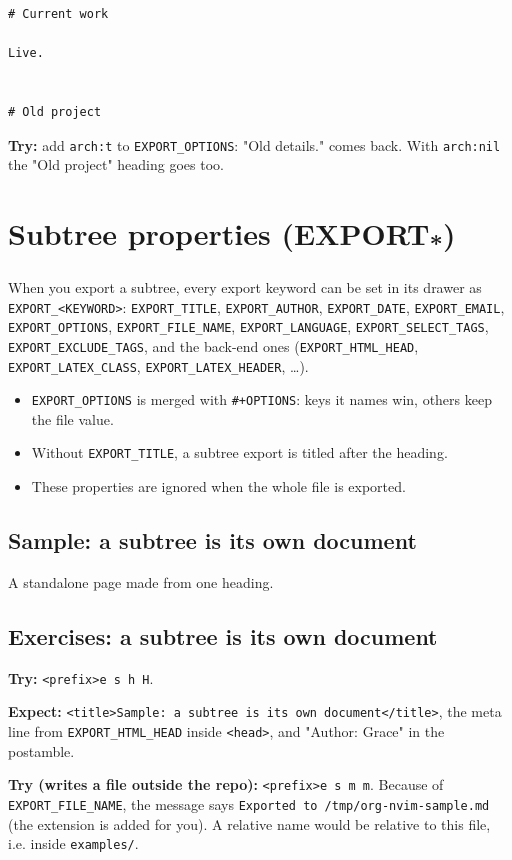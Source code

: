 \begin{verbatim}
# Current work

Live.


# Old project
\end{verbatim}

\textbf{Try:} add \texttt{arch:t} to \texttt{EXPORT\_OPTIONS}: "Old details." comes back. With
\texttt{arch:nil} the "Old project" heading goes too.
\section{Subtree properties (EXPORT\textsubscript{*})}
\label{sec:org05b67b0}
When you export a subtree, every export keyword can be set in its drawer as
\texttt{EXPORT\_<KEYWORD>}: \texttt{EXPORT\_TITLE}, \texttt{EXPORT\_AUTHOR}, \texttt{EXPORT\_DATE},
\texttt{EXPORT\_EMAIL}, \texttt{EXPORT\_OPTIONS}, \texttt{EXPORT\_FILE\_NAME}, \texttt{EXPORT\_LANGUAGE},
\texttt{EXPORT\_SELECT\_TAGS}, \texttt{EXPORT\_EXCLUDE\_TAGS}, and the back-end ones
(\texttt{EXPORT\_HTML\_HEAD}, \texttt{EXPORT\_LATEX\_CLASS}, \texttt{EXPORT\_LATEX\_HEADER}, \ldots{}).
\begin{itemize}
\item \texttt{EXPORT\_OPTIONS} is merged with \texttt{\#+OPTIONS}: keys it names win, others
keep the file value.
\item Without \texttt{EXPORT\_TITLE}, a subtree export is titled after the heading.
\item These properties are ignored when the whole file is exported.
\end{itemize}
\subsection{Sample: a subtree is its own document}
\label{sec:org0288272}
A standalone page made from one heading.
\subsection{Exercises: a subtree is its own document}
\label{sec:orgc8654cb}
\textbf{Try:} \texttt{<prefix>e s h H}.

\textbf{Expect:} \texttt{<title>Sample: a subtree is its own document</title>}, the meta
line from \texttt{EXPORT\_HTML\_HEAD} inside \texttt{<head>}, and "Author: Grace" in the
postamble.

\textbf{Try (writes a file outside the repo):} \texttt{<prefix>e s m m}. Because of
\texttt{EXPORT\_FILE\_NAME}, the message says \texttt{Exported to /tmp/org-nvim-sample.md}
(the extension is added for you). A relative name would be relative to
this file, i.e. inside \texttt{examples/}.
